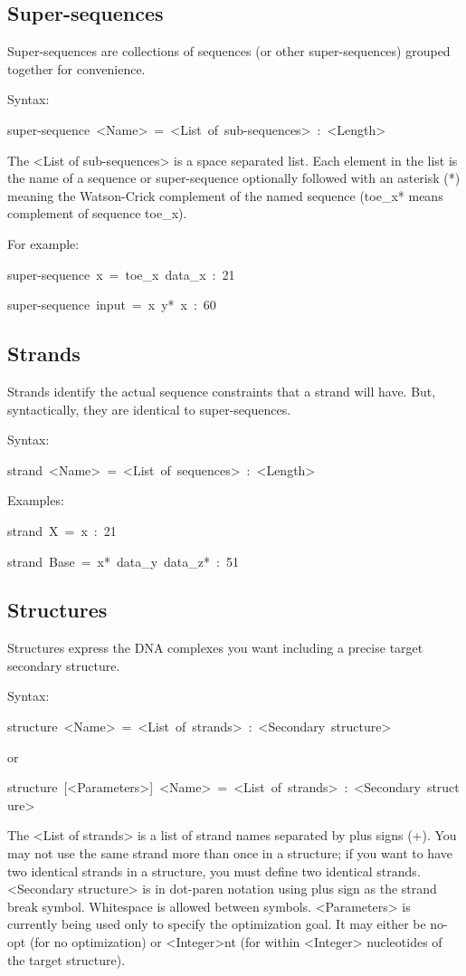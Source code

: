 \documentclass{article}
\newenvironment{code}
{\par\begin{list}{}{
\setlength{\rightmargin}{\leftmargin}
\setlength{\listparindent}{0pt}
\raggedright
\setlength{\itemsep}{0pt}
\setlength{\parsep}{0pt}
\normalfont\ttfamily}
 \item[]}
{\end{list}}
\begin{document}
\subsection{Super-sequences}

Super-sequences are collections of sequences (or other super-sequences)
grouped together for convenience.

Syntax:
\begin{code}
super-sequence~<Name>~=~<List~of~sub-sequences>~:~<Length>
\end{code}
The <List of sub-sequences> is a space separated list. Each element
in the list is the name of a sequence or super-sequence optionally
followed with an asterisk ({*}) meaning the Watson-Crick complement
of the named sequence (toe\_x{*} means complement of sequence toe\_x).

For example:
\begin{code}
super-sequence~x~=~toe\_x~data\_x~:~21

super-sequence~input~=~x~y{*}~x~:~60
\end{code}

\subsection{Strands}

Strands identify the actual sequence constraints that a strand will
have. But, syntactically, they are identical to super-sequences.

Syntax:
\begin{code}
strand~<Name>~=~<List~of~sequences>~:~<Length>
\end{code}
Examples:
\begin{code}
strand~X~=~x~:~21

strand~Base~=~x{*}~data\_y~data\_z{*}~:~51
\end{code}

\subsection{Structures}

Structures express the DNA complexes you want including a precise
target secondary structure.

Syntax:
\begin{code}
structure~<Name>~=~<List~of~strands>~:~<Secondary~structure>
\end{code}
or
\begin{code}
structure~{[}<Parameters>{]}~<Name>~=~<List~of~strands>~:~<Secondary~structure>
\end{code}
The <List of strands> is a list of strand names separated by plus
signs (+). You may not use the same strand more than once in a structure;
if you want to have two identical strands in a structure, you must
define two identical strands. <Secondary structure> is in dot-paren
notation using plus sign as the strand break symbol. Whitespace is
allowed between symbols. <Parameters> is currently being used only
to specify the optimization goal. It may either be no-opt (for no
optimization) or <Integer>nt (for within <Integer> nucleotides of
the target structure).
\end{document}
